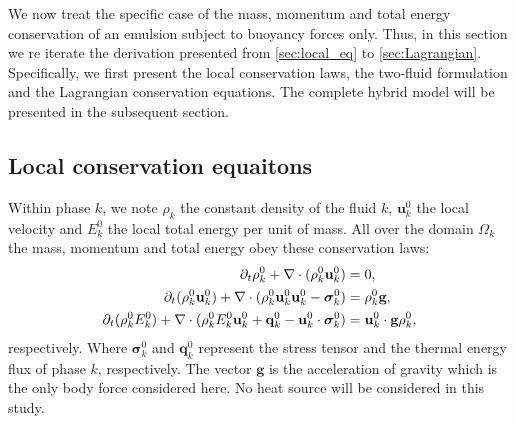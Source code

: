 We now treat the specific case of the mass, momentum and total energy conservation of an emulsion subject to buoyancy forces only. 
Thus, in this section we re iterate the derivation presented from \ref{sec:local_eq} to \ref{sec:Lagrangian}. 
Specifically, we first  present the local conservation laws, the two-fluid formulation and the Lagrangian conservation equations. 
The complete hybrid model will be presented in the subsequent section. 


\subsection{Local conservation equaitons}

Within phase $k$, we note $\rho_k$ the constant density of the fluid $k$, $\textbf{u}_k^0$ the local velocity and $E_k^0$ the local total energy per unit of mass.
All over the domain $\Omega_k$ the mass, momentum and total energy obey these conservation laws:
\begin{align}
    \label{eq:dt_rho}
    \partial_t \rho_k^0  
    + \mathbf{\nabla}\cdot (
        \rho_k^0\textbf{u}_k^0
    )
    &= 
    0,\\
    \label{eq:dt_rhou_k}
    \partial_t (\rho_k^0\textbf{u}_k^0)  
    + \mathbf{\nabla}\cdot (
        \rho_k^0\textbf{u}_k^0\textbf{u}_k^0
        - \bm{\sigma}_k^0 
    )
    &= 
    \rho_k^0 \textbf{g},\\
    \label{eq:dt_rhoE_k}
    \partial_t (\rho_k^0E_k^0)  
    + \mathbf{\nabla}\cdot (
        \rho_k^0E_k^0\textbf{u}_k^0
        + \textbf{q}_k^0
        - \textbf{u}_k^0 \cdot \bm{\sigma}_k^0 
        )
    &= 
    \textbf{u}_k^0 \cdot \textbf{g}  \rho_k^0, 
\end{align} 
respectively. 
Where $\bm\sigma_k^0$ and $\textbf{q}_k^0$ represent the stress tensor and the thermal energy flux of phase $k$, respectively. 
The vector $\textbf{g}$ is the acceleration of gravity which is the only body force considered here.
No heat source will be considered in this study.

